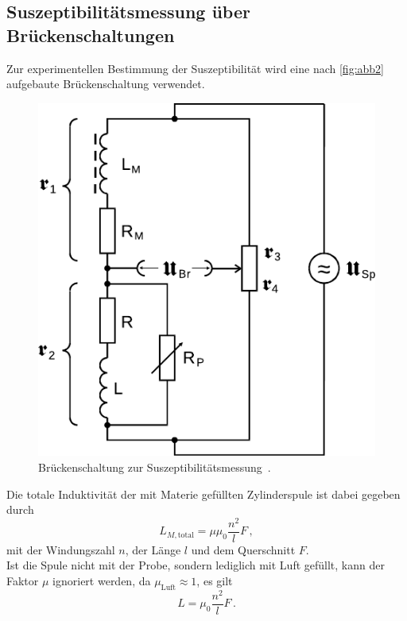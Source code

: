 \subsection{Suszeptibilitätsmessung über Brückenschaltungen}

Zur experimentellen Bestimmung der Suszeptibilität wird eine nach \autoref{fig:abb2} aufgebaute Brückenschaltung verwendet.

\begin{figure}
    \centering
    \includegraphics{figures/Abb_2.pdf}
    \caption{Brückenschaltung zur Suszeptibilitätsmessung$ \,$ \cite{ap07}.}
    \label{fig:abb2}
\end{figure}

Die totale Induktivität der mit Materie gefüllten Zylinderspule ist dabei gegeben durch
\begin{equation*}
    L_{M,\text{total}} = \mu \mu_0 \dfrac{n^2}{l} F \,,
    \label{eq:induspu}
\end{equation*}
mit der Windungszahl $n$, der Länge $l$ und dem Querschnitt $F$. \\

Ist die Spule nicht mit der Probe, sondern lediglich mit Luft gefüllt, kann der Faktor $\mu$ ignoriert werden, da $\mu_\text{Luft} \approx 1$, es gilt
\begin{equation*}
    L = \mu_0 \dfrac{n^2}{l} F \,.
\end{equation*} \\

